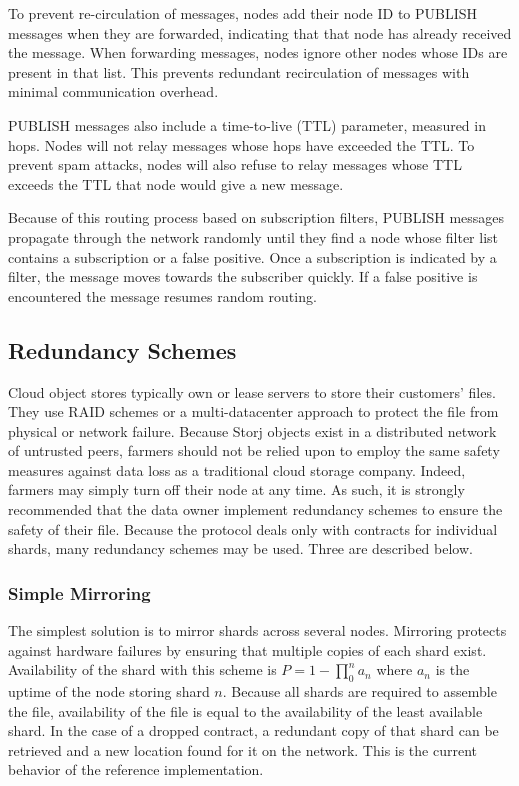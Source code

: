 \documentclass[a4paper,10pt]{article}
\begin{document}
To prevent re-circulation of messages, nodes add their node ID to PUBLISH messages when they are forwarded, indicating that that node has already received the message. When forwarding messages, nodes ignore other nodes whose IDs are present in that list. This prevents redundant recirculation of messages with minimal communication overhead.

PUBLISH messages also include a time-to-live (TTL) parameter, measured in hops. Nodes will not relay messages whose hops have exceeded the TTL. To prevent spam attacks, nodes will also refuse to relay messages whose TTL exceeds the TTL that node would give a new message.

Because of this routing process based on subscription filters, PUBLISH messages propagate through the network randomly until they find a node whose filter list contains a subscription or a false positive. Once a subscription is indicated by a filter, the message moves towards the subscriber quickly. If a false positive is encountered the message resumes random routing.

\subsection{Redundancy Schemes}
Cloud object stores typically own or lease servers to store their customers’ files. They use RAID schemes or a multi-datacenter approach to protect the file from physical or network failure. Because Storj objects exist in a distributed network of untrusted peers, farmers should not be relied upon to employ the same safety measures against data loss as a traditional cloud storage company. Indeed, farmers may simply turn off their node at any time. As such, it is strongly recommended that the data owner implement redundancy schemes to ensure the safety of their file. Because the protocol deals only with contracts for individual shards, many redundancy schemes may be used. Three are described below.

\subsubsection{Simple Mirroring}
The simplest solution is to mirror shards across several nodes. Mirroring protects against hardware failures by ensuring that multiple copies of each shard exist. Availability of the shard with this scheme is $ P = 1 - \prod_{0}^{n} a_{n} $ where $ a_{n} $ is the uptime of the node storing shard $ n $. Because all shards are required to assemble the file, availability of the file is equal to the availability of the least available shard. In the case of a dropped contract, a redundant copy of that shard can be retrieved and a new location found for it on the network. This is the current behavior of the reference implementation.
\end{document}
